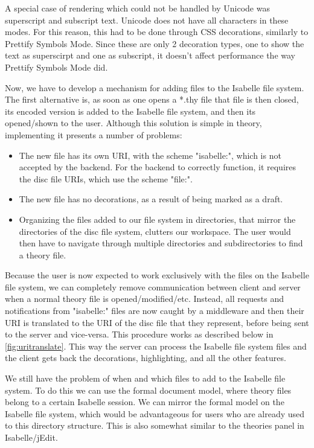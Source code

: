 A special case of rendering which could not be handled by Unicode was superscript and subscript text. Unicode does not have all characters in these modes. For this reason, this had to be done through CSS decorations, similarly to Prettify Symbols Mode. Since these are only 2 decoration types, one to show the text as superscirpt and one as subscript, it doesn't affect performance the way Prettify Symbols Mode did.

Now, we have to develop a mechanism for adding files to the Isabelle file system. The first alternative is, as soon as one opens a *.thy file that file is then closed, its encoded version is added to the Isabelle file system, and then its opened/shown to the user. Although this solution is simple in theory, implementing it presents a number of problems:
\begin{itemize}
    \item The new file has its own URI, with the scheme "isabelle:", which is not accepted by the backend. For the backend to correctly function, it requires the disc file URIs, which use the scheme "file:". 
    \item The new file has no decorations, as a result of being marked as a draft.
    \item Organizing the files added to our file system in directories, that mirror the directories of the disc file system, clutters our workspace. The user would then have to navigate through multiple directories and subdirectories to find a theory file.
\end{itemize}

Because the user is now expected to work exclusively with the files on the Isabelle file system, we can completely remove communication between client and server when a normal theory file is opened/modified/etc. Instead, all requests and notifications from "isabelle:" files are now caught by a middleware and then their URI is translated to the URI of the disc file that they represent, before being sent to the server and vice-versa. This procedure works as described below in \autoref{fig:uritranslate}. This way the server can process the Isabelle file system files and the client gets back the decorations, highlighting, and all the other features.

We still have the problem of when and which files to add to the Isabelle file system. To do this we can use the formal document model, where theory files belong to a certain Isabelle session. We can mirror the formal model on the Isabelle file system, which would be advantageous for users who are already used to this directory structure. This is also somewhat similar to the theories panel in Isabelle/jEdit.

